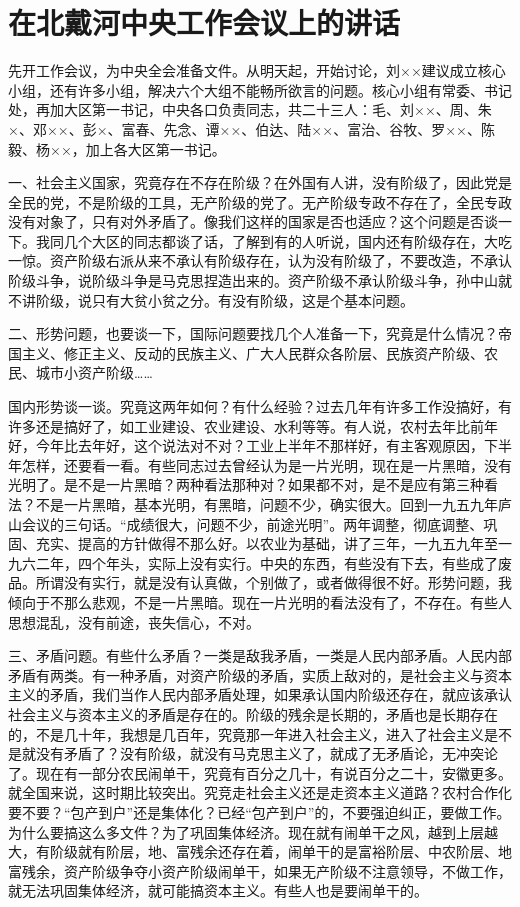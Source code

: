 \section[在北戴河中央工作会议上的讲话（一九六二年八月六日）]{在北戴河中央工作会议上的讲话}


先开工作会议，为中央全会准备文件。从明天起，开始讨论，刘××建议成立核心小组，还有许多小组，解决六个大组不能畅所欲言的问题。核心小组有常委、书记处，再加大区第一书记，中央各口负责同志，共二十三人：毛、刘××、周、朱×、邓××、彭×、富春、先念、谭××、伯达、陆××、富治、谷牧、罗××、陈毅、杨××，加上各大区第一书记。

一、社会主义国家，究竟存在不存在阶级？在外国有人讲，没有阶级了，因此党是全民的党，不是阶级的工具，无产阶级的党了。无产阶级专政不存在了，全民专政没有对象了，只有对外矛盾了。像我们这样的国家是否也适应？这个问题是否谈一下。我同几个大区的同志都谈了话，了解到有的人听说，国内还有阶级存在，大吃一惊。资产阶级右派从来不承认有阶级存在，认为没有阶级了，不要改造，不承认阶级斗争，说阶级斗争是马克思捏造出来的。资产阶级不承认阶级斗争，孙中山就不讲阶级，说只有大贫小贫之分。有没有阶级，这是个基本问题。

二、形势问题，也要谈一下，国际问题要找几个人准备一下，究竟是什么情况？帝国主义、修正主义、反动的民族主义、广大人民群众各阶层、民族资产阶级、农民、城市小资产阶级……

国内形势谈一谈。究竟这两年如何？有什么经验？过去几年有许多工作没搞好，有许多还是搞好了，如工业建设、农业建设、水利等等。有人说，农村去年比前年好，今年比去年好，这个说法对不对？工业上半年不那样好，有主客观原因，下半年怎样，还要看一看。有些同志过去曾经认为是一片光明，现在是一片黑暗，没有光明了。是不是一片黑暗？两种看法那种对？如果都不对，是不是应有第三种看法？不是一片黑暗，基本光明，有黑暗，问题不少，确实很大。回到一九五九年庐山会议的三句话。“成绩很大，问题不少，前途光明”。两年调整，彻底调整、巩固、充实、提高的方针做得不那么好。以农业为基础，讲了三年，一九五九年至一九六二年，四个年头，实际上没有实行。中央的东西，有些没有下去，有些成了废品。所谓没有实行，就是没有认真做，个别做了，或者做得很不好。形势问题，我倾向于不那么悲观，不是一片黑暗。现在一片光明的看法没有了，不存在。有些人思想混乱，没有前途，丧失信心，不对。

三、矛盾问题。有些什么矛盾？一类是敌我矛盾，一类是人民内部矛盾。人民内部矛盾有两类。有一种矛盾，对资产阶级的矛盾，实质上敌对的，是社会主义与资本主义的矛盾，我们当作人民内部矛盾处理，如果承认国内阶级还存在，就应该承认社会主义与资本主义的矛盾是存在的。阶级的残余是长期的，矛盾也是长期存在的，不是几十年，我想是几百年，究竟那一年进入社会主义，进入了社会主义是不是就没有矛盾了？没有阶级，就没有马克思主义了，就成了无矛盾论，无冲突论了。现在有一部分农民闹单干，究竟有百分之几十，有说百分之二十，安徽更多。就全国来说，这时期比较突出。究竞走社会主义还是走资本主义道路？农村合作化要不要？“包产到户”还是集体化？已经“包产到户”的，不要强迫纠正，要做工作。为什么要搞这么多文件？为了巩固集体经济。现在就有闹单干之风，越到上层越大，有阶级就有阶层，地、富残余还存在着，闹单干的是富裕阶层、中农阶层、地富残余，资产阶级争夺小资产阶级闹单干，如果无产阶级不注意领导，不做工作，就无法巩固集体经济，就可能搞资本主义。有些人也是要闹单干的。

